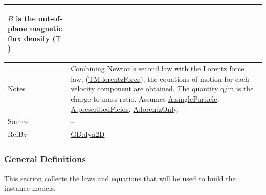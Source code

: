 \documentclass[12pt]{article}
\begin{document}
\begin{minipage}{\textwidth}
\begin{tabular}{>{\raggedright}p{}>{\raggedright\arraybackslash}p{}}
\begin{symbDescription}
              \item{$B$ is the out-of-plane magnetic flux density (${\text{T}}$)}
              \end{symbDescription}
\\ \midrule
Notes & Combining Newton's second law with the Lorentz force law, (\hyperref[TM:lorentzForce]{TM:lorentzForce}), the equations of motion for each velocity component are obtained. The quantity q/m is the charge-to-mass ratio. Assumes \hyperref[singleParticle]{A:singleParticle}, \hyperref[prescribedFields]{A:prescribedFields}, \hyperref[lorentzOnly]{A:lorentzOnly}.
        
\\ \midrule
Source & --
         
\\ \midrule
RefBy & \hyperref[GD:dyn2D]{GD:dyn2D}
        
\\ \bottomrule
\end{tabular}
\end{minipage}

\subsubsection{General Definitions}
\label{Sec:GDs}
This section collects the laws and equations that will be used to build the instance models.
\end{document}
